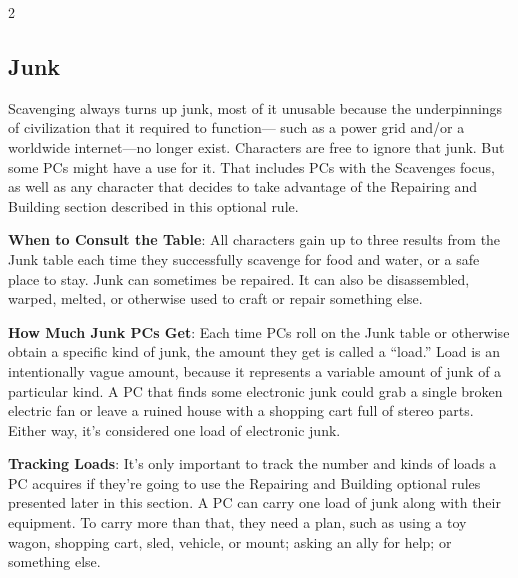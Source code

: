 \begin{multicols}{2}

\subsection{Junk}

Scavenging always turns up junk, most of it unusable because the underpinnings of civilization that it required to function— such as a power grid and/or a worldwide internet—no longer exist. Characters are free to ignore that junk. But some PCs might have a use for it. That includes PCs with the Scavenges focus, as well as any character that decides to take advantage of the Repairing and Building section described in this optional rule. 

\textbf{When to Consult the Table}: All characters gain up to three results from the Junk table each time they successfully scavenge for food and water, or a safe place to stay. Junk can sometimes be repaired. It can also be disassembled, warped, melted, or otherwise used to craft or repair something else. 

\textbf{How Much Junk PCs Get}: Each time PCs roll on the Junk table or otherwise obtain a specific kind of junk, the amount they get is called a “load.” Load is an intentionally vague amount, because it represents a variable amount of junk of a particular kind. A PC that finds some electronic junk could grab a single broken electric fan or leave a ruined house with a shopping cart full of stereo parts. Either way, it’s considered one load of electronic junk. 

\textbf{Tracking Loads}: It’s only important to track the number and kinds of loads a PC acquires if they’re going to use the Repairing and Building optional rules presented later  in this section. A PC can carry one load of junk along with their equipment. To carry more than that, they need a plan, such as using a toy wagon, shopping cart, sled, vehicle, or mount; asking an ally for help; or something else.

\end{multicols}

